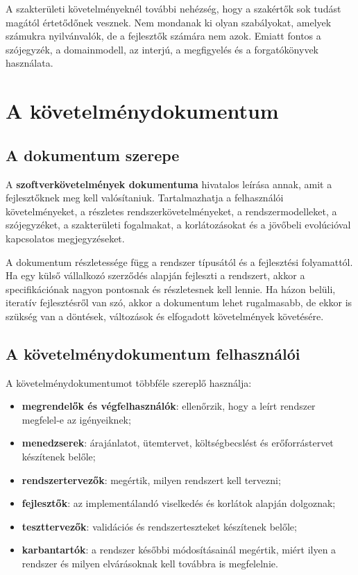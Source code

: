 A szakterületi követelményeknél további nehézség, hogy a szakértők sok tudást magától értetődőnek vesznek. Nem mondanak ki olyan szabályokat, amelyek számukra nyilvánvalók, de a fejlesztők számára nem azok. Emiatt fontos a szójegyzék, a domainmodell, az interjú, a megfigyelés és a forgatókönyvek használata.

\section{A követelménydokumentum}

\subsection{A dokumentum szerepe}

A \textbf{szoftverkövetelmények dokumentuma} hivatalos leírása annak, amit a fejlesztőknek meg kell valósítaniuk. Tartalmazhatja a felhasználói követelményeket, a részletes rendszerkövetelményeket, a rendszermodelleket, a szójegyzéket, a szakterületi fogalmakat, a korlátozásokat és a jövőbeli evolúcióval kapcsolatos megjegyzéseket.

A dokumentum részletessége függ a rendszer típusától és a fejlesztési folyamattól. Ha egy külső vállalkozó szerződés alapján fejleszti a rendszert, akkor a specifikációnak nagyon pontosnak és részletesnek kell lennie. Ha házon belüli, iteratív fejlesztésről van szó, akkor a dokumentum lehet rugalmasabb, de ekkor is szükség van a döntések, változások és elfogadott követelmények követésére.

\subsection{A követelménydokumentum felhasználói}

A követelménydokumentumot többféle szereplő használja:

\begin{itemize}
  \item \textbf{megrendelők és végfelhasználók}: ellenőrzik, hogy a leírt rendszer megfelel-e az igényeiknek;
  \item \textbf{menedzserek}: árajánlatot, ütemtervet, költségbecslést és erőforrástervet készítenek belőle;
  \item \textbf{rendszertervezők}: megértik, milyen rendszert kell tervezni;
  \item \textbf{fejlesztők}: az implementálandó viselkedés és korlátok alapján dolgoznak;
  \item \textbf{teszttervezők}: validációs és rendszerteszteket készítenek belőle;
  \item \textbf{karbantartók}: a rendszer későbbi módosításainál megértik, miért ilyen a rendszer és milyen elvárásoknak kell továbbra is megfelelnie.
\end{itemize}

